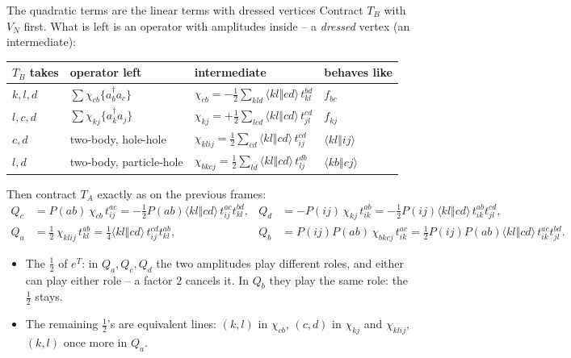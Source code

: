 \documentclass[aspectratio=169,10pt]{beamer}
\newcommand{\cre}[1]{a_{#1}^{\dagger}}
\newcommand{\ann}[1]{a_{#1}}
\newcommand{\no}[1]{\bigl\{#1\bigr\}}
\newcommand{\as}[4]{\langle #1#2\Vert #3#4\rangle}
\begin{document}
\begin{frame}[shrink=13]{The quadratic terms are the linear terms with dressed vertices}
\small
Contract $T_B$ with $V_N$ first. What is left is an operator with amplitudes inside -- a \emph{dressed} vertex (an intermediate):
\begin{center}
\renewcommand{\arraystretch}{1.45}
\begin{tabular}{llll}
\toprule
$T_B$ takes & operator left & intermediate & behaves like\\
\midrule
$k,l,d$ & $\sum\chi_{cb}\no{\cre b\ann c}$ & $\chi_{cb}=-\tfrac12\sum_{kld}\as klcd\,t_{kl}^{bd}$ & $f_{bc}$\\
$l,c,d$ & $\sum\chi_{kj}\no{\cre k\ann j}$ & $\chi_{kj}=+\tfrac12\sum_{lcd}\as klcd\,t_{jl}^{cd}$ & $f_{kj}$\\
$c,d$ & two-body, hole-hole & $\chi_{klij}=\tfrac12\sum_{cd}\as klcd\,t_{ij}^{cd}$ & $\as klij$\\
$l,d$ & two-body, particle-hole & $\chi_{bkcj}=\tfrac12\sum_{ld}\as klcd\,t_{lj}^{db}$ & $\as kbcj$\\
\bottomrule
\end{tabular}
\end{center}
Then contract $T_A$ exactly as on the previous frames:
\begin{align*}
 Q_c&=P(ab)\,\chi_{cb}\,t_{ij}^{ac}=-\tfrac12P(ab)\as klcd\,t_{ij}^{ac}t_{kl}^{bd},&
 Q_d&=-P(ij)\,\chi_{kj}\,t_{ik}^{ab}=-\tfrac12P(ij)\as klcd\,t_{ik}^{ab}t_{jl}^{cd},\\
 Q_a&=\tfrac12\,\chi_{klij}\,t_{kl}^{ab}=\tfrac14\as klcd\,t_{ij}^{cd}t_{kl}^{ab},&
 Q_b&=P(ij)P(ab)\,\chi_{bkcj}\,t_{ik}^{ac}=\tfrac12P(ij)P(ab)\as klcd\,t_{ik}^{ac}t_{jl}^{bd}.
\end{align*}
\begin{itemize}
\item The $\tfrac12$ of $e^{T}$: in $Q_a,Q_c,Q_d$ the two amplitudes play different roles, and either can play either role -- a factor $2$ cancels it. In $Q_b$ they play the same role: the $\tfrac12$ stays.
\item The remaining $\tfrac12$'s are equivalent lines: $(k,l)$ in $\chi_{cb}$, $(c,d)$ in $\chi_{kj}$ and $\chi_{klij}$, $(k,l)$ once more in $Q_a$.
\end{itemize}
\end{frame}
\end{document}
